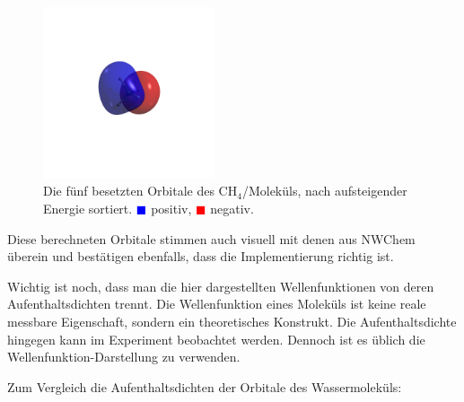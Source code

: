 \begin{enumerate}
\begin{figure}[H]
\includegraphics[trim=1200 1200 1200 1200, clip, width=0.45\textwidth]{res/CH4/ch4_w4.png}
\caption{Die fünf besetzten Orbitale des CH$_4$\-/Moleküls,
nach aufsteigender Energie sortiert.
\textcolor{blue}{$\blacksquare$} positiv,
\textcolor{red}{$\blacksquare$} negativ.}\label{ch4_orbitals}
\end{figure}

\end{enumerate}

Diese berechneten Orbitale stimmen auch visuell mit denen aus NWChem überein
und bestätigen ebenfalls, dass die Implementierung richtig ist.

Wichtig ist noch, dass man die hier dargestellten Wellenfunktionen von deren Aufenthaltsdichten trennt.
Die Wellenfunktion eines Moleküls ist keine reale messbare Eigenschaft,
sondern ein theoretisches Konstrukt.
Die Aufenthaltsdichte hingegen kann im Experiment beobachtet werden.
Dennoch ist es üblich die Wellenfunktion-Darstellung zu verwenden.

Zum Vergleich die Aufenthaltsdichten der Orbitale des Wassermoleküls:

